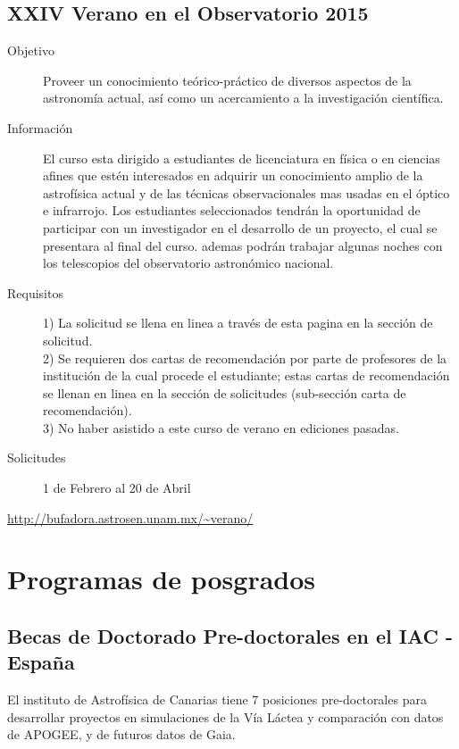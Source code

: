 \documentclass{book}
\begin{document}
\subsection{XXIV Verano en el Observatorio 2015}
\begin{description}
\item[Objetivo]
Proveer un conocimiento teórico-práctico de diversos aspectos de la astronomía actual, así como un acercamiento a la investigación científica.
\item[Información]
El curso esta dirigido a estudiantes de licenciatura en física o en ciencias afines que estén interesados en adquirir un conocimiento amplio de la astrofísica actual y de las técnicas observacionales mas usadas en el óptico e infrarrojo.
Los estudiantes seleccionados tendrán la oportunidad de participar con un investigador en el desarrollo de un proyecto, el cual se presentara al final del curso. ademas podrán trabajar algunas noches con los telescopios del observatorio astronómico nacional.
\item[Requisitos]
1) La solicitud se llena en linea a través de esta pagina en la sección de solicitud.\\
2) Se requieren dos cartas de recomendación por parte de profesores de la institución de la cual procede el estudiante; estas cartas de recomendación se llenan en linea en la sección de solicitudes (sub-sección carta de recomendación).\\
3) No haber asistido a este curso de verano en ediciones pasadas.
\item[Solicitudes] 1 de Febrero al 20 de Abril
\end{description}
\begin{center}
\url{http://bufadora.astrosen.unam.mx/~verano/}
\end{center}

       \section*{Programas de posgrados}

\subsection{Becas de Doctorado Pre-doctorales en el IAC - España}
El instituto de Astrofísica de Canarias tiene 7 posiciones pre-doctorales para desarrollar proyectos en simulaciones de la Vía Láctea  y comparación con datos de APOGEE, y de futuros datos de Gaia.
\end{document}
